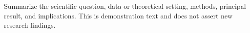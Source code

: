 Summarize the scientific question, data or theoretical setting, methods, principal
result, and implications. This is demonstration text and does not assert new
research findings.
